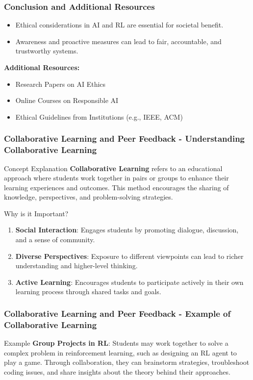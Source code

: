\documentclass[aspectratio=169]{beamer}
\begin{document}
\begin{frame}[fragile]
    \frametitle{Conclusion and Additional Resources}
    \begin{itemize}
        \item Ethical considerations in AI and RL are essential for societal benefit.
        \item Awareness and proactive measures can lead to fair, accountable, and trustworthy systems.
    \end{itemize}
    
    \textbf{Additional Resources:}
    \begin{itemize}
        \item Research Papers on AI Ethics
        \item Online Courses on Responsible AI
        \item Ethical Guidelines from Institutions (e.g., IEEE, ACM)
    \end{itemize}
\end{frame}

\begin{frame}[fragile]
    \frametitle{Collaborative Learning and Peer Feedback - Understanding Collaborative Learning}
    \begin{block}{Concept Explanation}
        \textbf{Collaborative Learning} refers to an educational approach where students work together in pairs or groups to enhance their learning experiences and outcomes. This method encourages the sharing of knowledge, perspectives, and problem-solving strategies.
    \end{block}

    \begin{block}{Why is it Important?}
        \begin{enumerate}
            \item \textbf{Social Interaction}: Engages students by promoting dialogue, discussion, and a sense of community.
            \item \textbf{Diverse Perspectives}: Exposure to different viewpoints can lead to richer understanding and higher-level thinking.
            \item \textbf{Active Learning}: Encourages students to participate actively in their own learning process through shared tasks and goals.
        \end{enumerate}
    \end{block}
\end{frame}

\begin{frame}[fragile]
    \frametitle{Collaborative Learning and Peer Feedback - Example of Collaborative Learning}
    \begin{block}{Example}
        \textbf{Group Projects in RL}: Students may work together to solve a complex problem in reinforcement learning, such as designing an RL agent to play a game. Through collaboration, they can brainstorm strategies, troubleshoot coding issues, and share insights about the theory behind their approaches.
    \end{block}
\end{frame}
\end{document}
